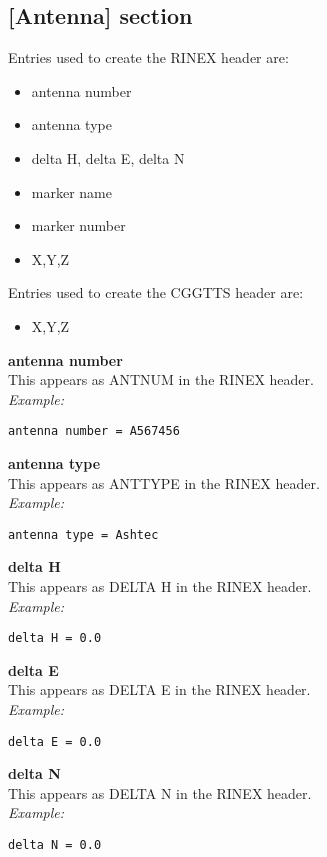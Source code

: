 \subsection{[Antenna] section}

Entries used to create the RINEX header are:
\begin{itemize}
\item antenna number
\item antenna type
\item delta H, delta E, delta N
\item marker name
\item marker number
\item X,Y,Z
\end{itemize}

Entries used to create the CGGTTS header are:
\begin{itemize}
\item X,Y,Z
\end{itemize}

\hypertarget{h:antenna}{}
{\bfseries antenna number}\\
This appears as ANTNUM in the RINEX header.\\
\textit{Example:}
\begin{lstlisting}
antenna number = A567456
\end{lstlisting}

{\bfseries antenna type}\\
This appears as ANTTYPE in the RINEX header.\\
\textit{Example:}
\begin{lstlisting}
antenna type = Ashtec
\end{lstlisting}

{\bfseries delta H}\\
This appears as DELTA H in the RINEX header.\\
\textit{Example:}
\begin{lstlisting}
delta H = 0.0
\end{lstlisting}

{\bfseries delta E}\\
This appears as DELTA E in the RINEX header.\\
\textit{Example:}
\begin{lstlisting}
delta E = 0.0
\end{lstlisting}

{\bfseries delta N}\\
This appears as DELTA N in the RINEX header.\\
\textit{Example:}
\begin{lstlisting}
delta N = 0.0
\end{lstlisting}

